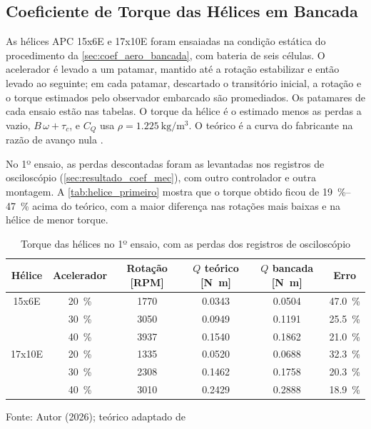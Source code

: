 \newpage

\subsection{Coeficiente de Torque das Hélices em Bancada}
\label{sec:resultado_coef_aero_bancada}

As hélices APC 15x6E e 17x10E foram ensaiadas na condição estática do
procedimento da \autoref{sec:coef_aero_bancada}, com bateria de seis células.
O acelerador é levado a um patamar, mantido até a rotação estabilizar e então
levado ao seguinte; em cada patamar, descartado o transitório inicial, a
rotação e o torque estimados pelo observador embarcado são promediados. Os
patamares de cada ensaio estão nas tabelas. O torque da
hélice é o estimado menos as perdas a vazio, $B\,\omega + \tau_c$, e $C_Q$ usa
$\rho = \SI{1,225}{\kilo\gram\per\cubic\meter}$. O teórico é a curva do
fabricante na razão de avanço nula \cite{apc_performance_data}.

No 1º ensaio, as perdas descontadas foram as levantadas nos registros de osciloscópio
(\autoref{sec:resultado_coef_mec}), com outro controlador e outra montagem. A \autoref{tab:helice_primeiro} mostra que o torque obtido
ficou de \SIrange{19}{47}{\percent} acima do teórico, com a maior diferença
nas rotações mais baixas e na hélice de menor torque.

\begin{table}[H]
    \centering
    \caption{Torque das hélices no 1º ensaio, com as perdas dos registros de osciloscópio}
    \label{tab:helice_primeiro}
    \small
    \begin{tabular}{cccccc}
        \toprule
        \textbf{Hélice} & \textbf{Acelerador} & \textbf{Rotação [RPM]} & \textbf{$Q$ teórico [\si{\newton\meter}]} & \textbf{$Q$ bancada [\si{\newton\meter}]} & \textbf{Erro} \\
        \midrule
        15x6E  & \SI{20}{\percent} & \num{1770} & \num{0,0343} & \num{0,0504} & \SI{+47,0}{\percent} \\
               & \SI{30}{\percent} & \num{3050} & \num{0,0949} & \num{0,1191} & \SI{+25,5}{\percent} \\
               & \SI{40}{\percent} & \num{3937} & \num{0,1540} & \num{0,1862} & \SI{+21,0}{\percent} \\
        \midrule
        17x10E & \SI{20}{\percent} & \num{1335} & \num{0,0520} & \num{0,0688} & \SI{+32,3}{\percent} \\
               & \SI{30}{\percent} & \num{2308} & \num{0,1462} & \num{0,1758} & \SI{+20,3}{\percent} \\
               & \SI{40}{\percent} & \num{3010} & \num{0,2429} & \num{0,2888} & \SI{+18,9}{\percent} \\
        \bottomrule
    \end{tabular}

    \vspace{2pt}
    {\small Fonte: Autor (2026); teórico adaptado de }
\end{table}

